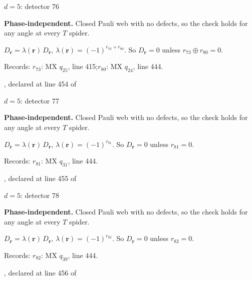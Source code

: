 \label{d5_det076}
{\Large $d=5$: detector 76}\par
\textbf{Phase-independent.} Closed Pauli web with no defects, so the check holds for any angle at every $T$ spider.
\begin{center}
\end{center}
\vspace{-1mm}
$D_{\boldsymbol r}=\lambda(\boldsymbol r)\,D_{\boldsymbol r}$, \quad $\lambda(\boldsymbol r)=(-1)^{r_{73}+r_{80}}$. \qquad So $D_{\boldsymbol r}=0$ unless $r_{73}\oplus r_{80}=0$.
\par\smallskip\begin{minipage}{.98\linewidth}\small Records: $r_{73}$: MX $q_{25}$, line 415;\quad $r_{80}$: MX $q_{24}$, line 444.\end{minipage}
\vfill
{\footnotesize\texttt{}, declared at line 454 of \texttt{}}
\newpage

\label{d5_det077}
{\Large $d=5$: detector 77}\par
\textbf{Phase-independent.} Closed Pauli web with no defects, so the check holds for any angle at every $T$ spider.
\begin{center}
\end{center}
\vspace{-1mm}
$D_{\boldsymbol r}=\lambda(\boldsymbol r)\,D_{\boldsymbol r}$, \quad $\lambda(\boldsymbol r)=(-1)^{r_{81}}$. \qquad So $D_{\boldsymbol r}=0$ unless $r_{81}=0$.
\par\smallskip\begin{minipage}{.98\linewidth}\small Records: $r_{81}$: MX $q_{31}$, line 444.\end{minipage}
\vfill
{\footnotesize\texttt{}, declared at line 455 of \texttt{}}
\newpage

\label{d5_det078}
{\Large $d=5$: detector 78}\par
\textbf{Phase-independent.} Closed Pauli web with no defects, so the check holds for any angle at every $T$ spider.
\begin{center}
\end{center}
\vspace{-1mm}
$D_{\boldsymbol r}=\lambda(\boldsymbol r)\,D_{\boldsymbol r}$, \quad $\lambda(\boldsymbol r)=(-1)^{r_{82}}$. \qquad So $D_{\boldsymbol r}=0$ unless $r_{82}=0$.
\par\smallskip\begin{minipage}{.98\linewidth}\small Records: $r_{82}$: MX $q_{39}$, line 444.\end{minipage}
\vfill
{\footnotesize\texttt{}, declared at line 456 of \texttt{}}
\newpage

